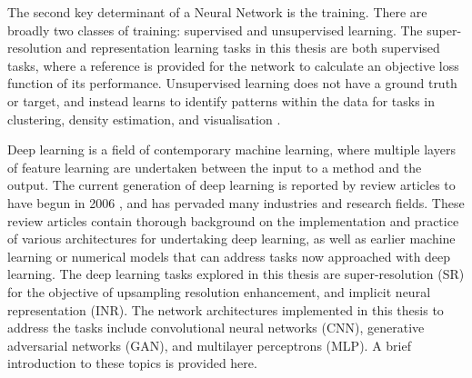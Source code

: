 The second key determinant of a Neural Network is the training.
There are broadly two classes of training: supervised and unsupervised learning.
The super-resolution and representation learning tasks in this thesis are both supervised tasks, where a reference is provided for the network to calculate an objective loss function of its performance.
Unsupervised learning does not have a ground truth or target, and instead learns to identify patterns within the data for tasks in clustering, density estimation, and visualisation \parencite{bishopPatternRecognitionMachine2006}.

Deep learning is a field of contemporary machine learning, where multiple layers of feature learning are undertaken between the input to a method and the output.
The current generation of deep learning is reported by review articles to have begun in 2006 \parencite{dengDeepLearningMethods2014,goodfellowDeepLearning2016a}, and has pervaded many industries and research fields.
These review articles contain thorough background on the implementation and practice of various architectures for undertaking deep learning, as well as earlier machine learning or numerical models that can address tasks now approached with deep learning.
The deep learning tasks explored in this thesis are super-resolution (SR) for the objective of upsampling resolution enhancement, and implicit neural representation (INR).
The network architectures implemented in this thesis to address the tasks include convolutional neural networks (CNN), generative adversarial networks (GAN), and multilayer perceptrons (MLP).
A brief introduction to these topics is provided here.

